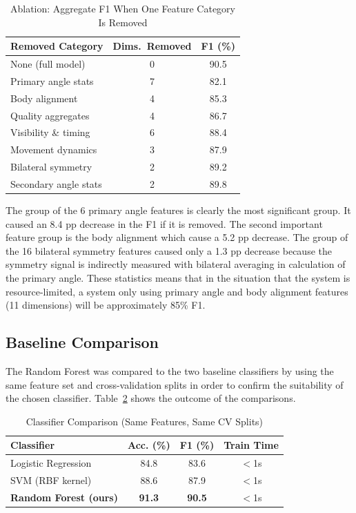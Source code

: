 \documentclass[conference]{IEEEtran}
\begin{document}
\begin{table}[ht]
\caption{Ablation: Aggregate F1 When One Feature Category Is Removed}
\label{tab:ablation}
\centering
\renewcommand{\arraystretch}{1.15}
\begin{tabular}{@{}lcc@{}}
\toprule
\textbf{Removed Category} & \textbf{Dims.\ Removed} & \textbf{F1 (\%)} \\
\midrule
None (full model) & 0 & 90.5 \\
Primary angle stats & 7 & 82.1 \\
Body alignment & 4 & 85.3 \\
Quality aggregates & 4 & 86.7 \\
Visibility \& timing & 6 & 88.4 \\
Movement dynamics & 3 & 87.9 \\
Bilateral symmetry & 2 & 89.2 \\
Secondary angle stats & 2 & 89.8 \\
\bottomrule
\end{tabular}
\end{table}

The group of the 6 primary angle features is clearly the most significant group. It caused an 8.4 pp decrease in the F1 if it is removed. The second important feature group is the body alignment which cause a 5.2 pp decrease. The group of the 16 bilateral symmetry features caused only a 1.3 pp decrease because the symmetry signal is indirectly measured with bilateral averaging in calculation of the primary angle. These statistics means that in the situation that the system is resource-limited, a system only using primary angle and body alignment features (11 dimensions) will be approximately 85\% F1.

\subsection{Baseline Comparison}

The Random Forest was compared to the two baseline classifiers by using the same feature set and cross-validation splits in order to confirm the suitability of the chosen classifier. Table~\ref{tab:baselines} shows the outcome of the comparisons.

\begin{table}[ht]
\caption{Classifier Comparison (Same Features, Same CV Splits)}
\label{tab:baselines}
\centering
\renewcommand{\arraystretch}{1.15}
\begin{tabular}{@{}lccc@{}}
\toprule
\textbf{Classifier} & \textbf{Acc. (\%)} & \textbf{F1 (\%)} & \textbf{Train Time} \\
\midrule
Logistic Regression & 84.8 & 83.6 & $<$1s \\
SVM (RBF kernel) & 88.6 & 87.9 & $<$1s \\
\textbf{Random Forest (ours)} & \textbf{91.3} & \textbf{90.5} & $<$1s \\
\bottomrule
\end{tabular}
\end{table}
\end{document}
